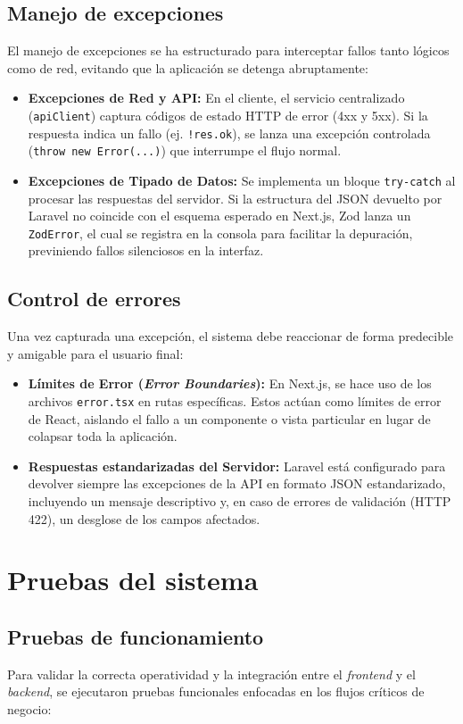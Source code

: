 \documentclass[12pt,letterpaper]{report}
\begin{document}
	\subsection{Manejo de excepciones}
	El manejo de excepciones se ha estructurado para interceptar fallos tanto lógicos como de red, evitando que la aplicación se detenga abruptamente:
	\begin{itemize}
		\item \textbf{Excepciones de Red y API:} En el cliente, el servicio centralizado (\texttt{apiClient}) captura códigos de estado HTTP de error (4xx y 5xx). Si la respuesta indica un fallo (ej. \texttt{!res.ok}), se lanza una excepción controlada (\texttt{throw new Error(...)}) que interrumpe el flujo normal.
		\item \textbf{Excepciones de Tipado de Datos:} Se implementa un bloque \texttt{try-catch} al procesar las respuestas del servidor. Si la estructura del JSON devuelto por Laravel no coincide con el esquema esperado en Next.js, Zod lanza un \texttt{ZodError}, el cual se registra en la consola para facilitar la depuración, previniendo fallos silenciosos en la interfaz.
	\end{itemize}
	
	\subsection{Control de errores}
	Una vez capturada una excepción, el sistema debe reaccionar de forma predecible y amigable para el usuario final:
	\begin{itemize}
		\item \textbf{Límites de Error (\textit{Error Boundaries}):} En Next.js, se hace uso de los archivos \texttt{error.tsx} en rutas específicas. Estos actúan como límites de error de React, aislando el fallo a un componente o vista particular en lugar de colapsar toda la aplicación.
		\item \textbf{Respuestas estandarizadas del Servidor:} Laravel está configurado para devolver siempre las excepciones de la API en formato JSON estandarizado, incluyendo un mensaje descriptivo y, en caso de errores de validación (HTTP 422), un desglose de los campos afectados.
	\end{itemize}
	
	\section{Pruebas del sistema}
	
	\subsection{Pruebas de funcionamiento}
	Para validar la correcta operatividad y la integración entre el \textit{front\-end} y el \textit{back\-end}, se ejecutaron pruebas funcionales enfocadas en los flujos críticos de negocio:
	
\end{document}
